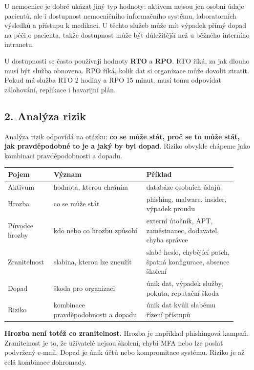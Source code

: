 U nemocnice je dobré ukázat jiný typ hodnoty: aktivem nejsou jen osobní údaje pacientů, ale i dostupnost nemocničního informačního systému, laboratorních výsledků a přístupu k medikaci. U těchto služeb může mít výpadek přímý dopad na péči o pacienta, takže dostupnost může být důležitější než u běžného interního intranetu.

U dostupnosti se často používají hodnoty \textbf{RTO} a \textbf{RPO}. RTO říká, za jak dlouho musí být služba obnovena. RPO říká, kolik dat si organizace může dovolit ztratit. Pokud má služba RTO 2 hodiny a RPO 15 minut, musí tomu odpovídat zálohování, replikace i havarijní plán.

\subsection*{2. Analýza rizik}

Analýza rizik odpovídá na otázku: \textbf{co se může stát, proč se to může stát, jak pravděpodobné to je a jaký by byl dopad}. Riziko obvykle chápeme jako kombinaci pravděpodobnosti a dopadu.

\begin{longtable}{p{0.18\linewidth}p{0.38\linewidth}p{0.37\linewidth}}
\toprule
\textbf{Pojem} & \textbf{Význam} & \textbf{Příklad} \\
\midrule\endhead
Aktivum & hodnota, kterou chráním & databáze osobních údajů \\
Hrozba & co se může stát & phishing, malware, insider, výpadek proudu \\
Původce hrozby & kdo nebo co hrozbu způsobí & externí útočník, APT, zaměstnanec, dodavatel, chyba správce \\
Zranitelnost & slabina, kterou lze zneužít & slabé heslo, chybějící patch, špatná konfigurace, absence školení \\
Dopad & škoda pro organizaci & únik dat, výpadek služby, pokuta, reputační škoda \\
Riziko & kombinace pravděpodobnosti a dopadu & únik dat kvůli slabému řízení přístupů \\
\bottomrule
\end{longtable}

\textbf{Hrozba není totéž co zranitelnost.} Hrozba je například phishingová kampaň. Zranitelnost je to, že uživatelé nejsou školení, chybí MFA nebo lze poslat podvržený e-mail. Dopad je únik účtů nebo kompromitace systému. Riziko je až celá kombinace dohromady.


